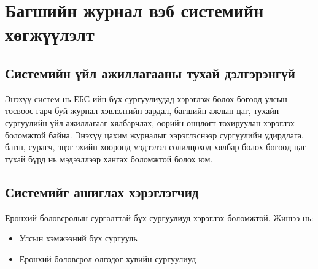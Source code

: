 
\chapter{Багшийн журнал вэб системийн хөгжүүлэлт} %
\label{Chapter2} %

\section{Системийн үйл ажиллагааны тухай дэлгэрэнгүй }
Энэхүү систем нь ЕБС-ийн бүх сургуулиудад хэрэглэж болох бөгөөд улсын төсвөөс гарч буй журнал хэвлэлтийн зардал, багшийн ажлын цаг, тухайн сургуулийн үйл ажиллагааг хялбарчлах, өөрийн онцлогт тохируулан хэрэглэх боломжтой байна. Энэхүү цахим журналыг хэрэглэснээр сургуулийн удирдлага, багш, сурагч, эцэг эхийн хооронд мэдээлэл солилцоход хялбар болох бөгөөд цаг тухай бүрд нь мэдээллээр хангах боломжтой болох юм.

\section{Системийг ашиглах хэрэглэгчид}
Ерөнхий боловсролын сургалттай бүх сургуулиуд хэрэглэх боломжтой.
Жишээ нь: 
\begin{itemize}
\item Улсын хэмжээний бүх сургууль
\item Ерөнхий боловсрол олгодог хувийн сургуулиуд
\end{itemize}
